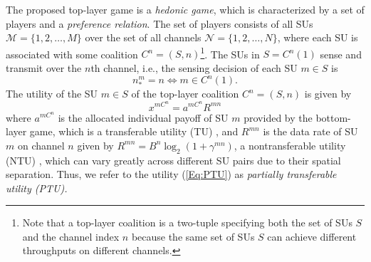 \documentclass[journal,draftclsnofoot,onecolumn]{IEEEtran}
\theoremstyle{definition}
\begin{document}
The proposed top-layer game is a \emph{hedonic game}, which is characterized by a set of players and a \emph{preference relation}\cite{Hedonic}. The set of players consists of all SUs $\mathcal{M}=\{1,2,\ldots,M\}$ over the set of all channels $\mathcal{N}=\{1,2,\ldots,N\}$, where each SU is associated with some coalition $C^n=(S,n)$\footnote{Note that a top-layer coalition is a two-tuple specifying both the set of SUs $S$ and the channel index $n$ because the same set of SUs $S$ can achieve different throughputs on different channels.}. The SUs in $S=C^n(1)$ sense and transmit over the $n$th channel, i.e., the sensing decision of each SU $m \in S$ is
\begin{equation}\label{Eq:SenseDec}
n^m_*=n\Leftrightarrow m\in C^n(1).
\end{equation}
The utility of the SU $m\in S$ of the top-layer coalition $C^n=(S,n)$ is given by
\begin{equation}\label{Eq:PTU}
x^{mC^n}=a^{mC^n}R^{mn}
\end{equation}
where $a^{mC^n}$ is the allocated individual payoff of SU $m$ provided by the bottom-layer game,  which is a transferable utility (TU) \cite{CoalGameSurvey}, and $R^{mn}$ is the data rate of SU $m$ on channel $n$ given by $R^{mn}=B^{n}\log_2(1+\gamma^{mn})$, a nontransferable utility (NTU) \cite{CoalGameSurvey}, which can vary greatly across different SU pairs due to their spatial separation. Thus, we refer to the utility (\ref{Eq:PTU}) as \emph{partially transferable utility (PTU).}
\end{document}
